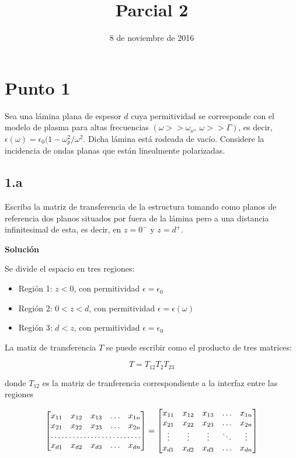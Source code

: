 \documentclass[a4paper,11pt]{article}
\title{{\bf\Large Parcial 2}}
\author{\normalfont
\author[{Juan Sebastián Valbuena Bermúdez}\\\normalfont\sc Universidad Nacional de Colombia \\\normalfont\sc Electrodinámica 2}
\date{8 de noviembre de 2016}
\begin{document}
%

\maketitle
\author{}

\section*{Punto 1}
Sea una lámina plana de espesor $d$ cuya permitividad se corresponde con el modelo de plasma para altas frecuencias $(\omega >> \omega_o,\ \omega>>\Gamma)$, es decir,  $\epsilon(\omega)=\epsilon_0 (1- \omega_p^2 / \omega^2$. Dicha lámina está rodeada de vacío. Considere la incidencia de ondas planas que están linealmente polarizadas.


\subsection*{1.a}
Escriba la matriz de transferencia de la estructura tomando como planos de referencia dos planos situados por fuera de la lámina pero a una distancia infinitesimal de esta, es decir, en $z=0^-$ y $z=d^+$.

\textbf{Solución}

Se divide el espacio en tres regiones: 
\begin{itemize}
    \item Región 1: $z<0$, con permitividad $\epsilon = \epsilon_0$
    
    \item Región 2: $0<z<d$, con permitividad $\epsilon = \epsilon(\omega)$
    
    \item Región 3: $d<z$, con permitividad $\epsilon = \epsilon_0$
\end{itemize}

La matiz de transferencia $T$ se puede escribir como el producto de tres matrices:

$$T=T_{12}T_{2}T_{23}$$

donde $T_12$ es la matriz de tranferencia correspondiente a la interfaz entre las regiones



\[
\begin{bmatrix}
    x_{11}       & x_{12} & x_{13} & \dots & x_{1n} \\
    x_{21}       & x_{22} & x_{23} & \dots & x_{2n} \\
    \hdotsfor{5} \\
    x_{d1}       & x_{d2} & x_{d3} & \dots & x_{dn}
\end{bmatrix}
=
\begin{bmatrix}
    x_{11} & x_{12} & x_{13} & \dots  & x_{1n} \\
    x_{21} & x_{22} & x_{23} & \dots  & x_{2n} \\
    \vdots & \vdots & \vdots & \ddots & \vdots \\
    x_{d1} & x_{d2} & x_{d3} & \dots  & x_{dn}
\end{bmatrix}
\]
\end{document}
